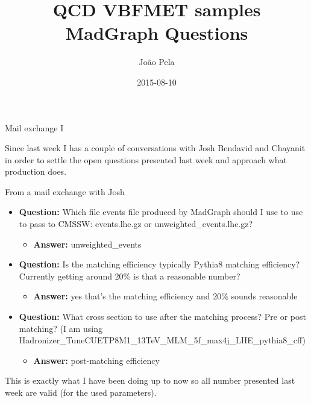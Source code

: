 \documentclass[8pt]{beamer}
\author[J. Pela]{João Pela}
\title{QCD VBFMET samples MadGraph Questions}
\institute[ICL]{Imperial College London}
\date{2015-08-10}
\begin{document}
\setlength{\unitlength}{1mm}

\begin{frame}
  \titlepage
\end{frame}

\begin{frame}{Mail exchange I}

Since last week I has a couple of conversations with Josh Bendavid and Chayanit in order to settle the open questions presented last week and approach what production does.

\begin{block}{From a mail exchange with Josh}

\begin{itemize}
  \item \textbf{Question:} Which file events file produced by MadGraph should I use to use to pass to CMSSW: events.lhe.gz or unweighted\_events.lhe.gz?
  \begin{itemize}
    \item \textbf{Answer:} unweighted\_events
  \end{itemize}
  
  \item \textbf{Question:} Is the matching efficiency typically Pythia8 matching efficiency? Currently getting around 20\% is that a reasonable number?
  \begin{itemize}
    \item \textbf{Answer:} yes that's the matching efficiency and 20\% sounds reasonable
  \end{itemize}
  
  \item \textbf{Question:} What cross section to use after the matching process? Pre or post matching? (I am using Hadronizer\_TuneCUETP8M1\_13TeV\_MLM\_5f\_max4j\_LHE\_pythia8\_cff)
  \begin{itemize}
    \item \textbf{Answer:} post-matching efficiency
  \end{itemize}
\end{itemize}

\end{block}

This is exactly what I have been doing up to now so all number presented last week are valid (for the used parameters).

\end{frame}
\end{document}
